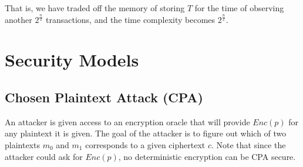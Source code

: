 \documentclass[11pt]{report}
\begin{document}
That is, we have traded off the memory of storing $T$ for the time of observing another $2^{\frac{n}{2}}$ transactions, and the time complexity becomes $2^{\frac{n}{2}}$.

\section{Security Models}
\subsection{Chosen Plaintext Attack (CPA)}
An attacker is given access to an encryption oracle that will provide $Enc(p)$ for any plaintext it is given. The goal of the attacker is to figure out which of two plaintexts $m_0$ and $m_1$ corresponds to a given ciphertext $c$. Note that since the attacker could ask for $Enc(p)$, no deterministic encryption can be CPA secure.
\end{document}
